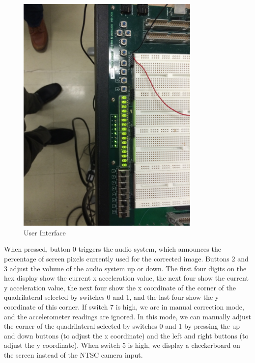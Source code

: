 \documentclass{article}
\begin{document}
\begin{center}
\begin{figure}[H]
\label{fig:ui}
\caption{User Interface}
\centering
\includegraphics[width=0.8\textwidth, angle=90]{./img/ui}
\end{figure}
\end{center}

When pressed, button 0 triggers the audio system, which announces the percentage of screen pixels currently used for the corrected image.
Buttons 2 and 3 adjust the volume of the audio system up or down.
The first four digits on the hex display show the current x acceleration value,
the next four show the current y acceleration value,
the next four show the x coordinate of the corner of the quadrilateral selected by switches 0 and 1,
and the last four show the y coordinate of this corner.
If switch 7 is high, we are in manual correction mode,
and the accelerometer readings are ignored.
In this mode, we can manually adjust the corner of the quadrilateral selected by switches 0 and 1 by pressing the up and down buttons (to adjust the x coordinate) and the left and right buttons (to adjust the y coordinate).
When switch 5 is high, we display a checkerboard on the screen instead of the NTSC camera input.
\end{document}

